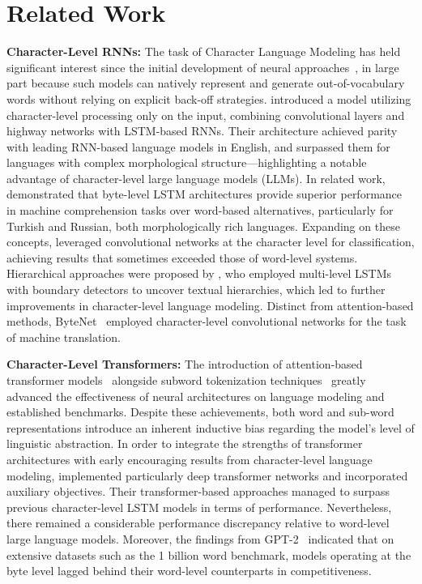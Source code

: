 \section{Related Work}
\label{section:related_work}

\textbf{Character-Level RNNs:} The task of Character Language Modeling has held significant interest since the initial development of neural approaches~\citep{sutskever2011generating,mikolov2012subword,graves2013generating}, in large part because such models can natively represent and generate out-of-vocabulary words without relying on explicit back-off strategies. \cite{kim2016character} introduced a model utilizing character-level processing only on the input, combining convolutional layers and highway networks with LSTM-based RNNs. Their architecture achieved parity with leading RNN-based language models in English, and surpassed them for languages with complex morphological structure—highlighting a notable advantage of character-level large language models (LLMs). In related work, \cite{kenter2018byte} demonstrated that byte-level LSTM architectures provide superior performance in machine comprehension tasks over word-based alternatives, particularly for Turkish and Russian, both morphologically rich languages. Expanding on these concepts, \cite{zhang2015character} leveraged convolutional networks at the character level for classification, achieving results that sometimes exceeded those of word-level systems. Hierarchical approaches were proposed by \citet{chung2019hierarchical}, who employed multi-level LSTMs with boundary detectors to uncover textual hierarchies, which led to further improvements in character-level language modeling. Distinct from attention-based methods, ByteNet~\cite{kalchbrenner2016neural} employed character-level convolutional networks for the task of machine translation.

\textbf{Character-Level Transformers:} The introduction of attention-based transformer models~\citep{vaswani2017attention} alongside subword tokenization techniques~\citep{sennrich-etal-2016-neural} greatly advanced the effectiveness of neural architectures on language modeling and established benchmarks. Despite these achievements, both word and sub-word representations introduce an inherent inductive bias regarding the model's level of linguistic abstraction. In order to integrate the strengths of transformer architectures with early encouraging results from character-level language modeling, \citet{al2019character} implemented particularly deep transformer networks and incorporated auxiliary objectives. Their transformer-based approaches managed to surpass previous character-level LSTM models in terms of performance. Nevertheless, there remained a considerable performance discrepancy relative to word-level large language models. Moreover, the findings from GPT-2~\citep{radfordgpt2} indicated that on extensive datasets such as the 1 billion word benchmark, models operating at the byte level lagged behind their word-level counterparts in competitiveness.

